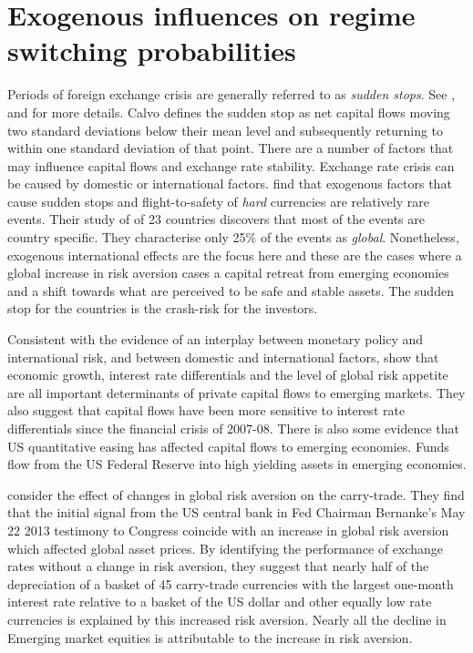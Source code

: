 \documentclass[12pt, a4paper, oneside]{article}\usepackage[]{graphicx}\usepackage[]{color}
\begin{document}
\section{Exogenous influences on regime switching probabilities}
Periods of foreign exchange crisis are generally referred to as \emph{sudden stops}.  See \citet{DornbuschSS}, \citet{CalvoSS} and \citet{KrugmanSS} for more details. Calvo  defines the sudden stop as net capital flows moving two standard deviations below their mean level and subsequently returning to within one standard deviation of that point. There are a number of factors that may influence capital flows and exchange rate stability. Exchange rate crisis can be caused by domestic or international factors.  \citet{FTS} find  that exogenous factors that cause sudden stops and flight-to-safety of \emph{hard} currencies  are relatively rare events. Their study of of 23 countries discovers that most of the events are country specific. They characterise only 25\% of the events as \emph{global}. Nonetheless, exogenous international effects are the focus here and these are the cases where a global increase in risk aversion cases a capital retreat from emerging economies and a shift towards what are perceived to be safe and stable assets. The sudden stop for the countries is the crash-risk for the investors. 

  Consistent with the evidence of an interplay between monetary policy and international risk, and between domestic and international factors, \citet{Ahmed2014} show that economic growth, interest rate differentials and the level of global risk appetite are all important determinants of private capital flows to emerging markets.  They also suggest that capital flows have been more sensitive to interest rate differentials since the financial crisis of 2007-08. There is also some evidence that US quantitative easing has affected capital flows to emerging economies.  Funds flow from the US Federal Reserve into high yielding assets in emerging economies. 

\citet{NYFedtaper} consider the effect of changes in global risk aversion on the carry-trade.  They find that the initial signal from the US central bank in Fed Chairman Bernanke's May 22 2013 testimony to Congress coincide with an increase in global risk aversion which affected global asset prices.  By identifying the performance of exchange rates without a change in risk aversion, they suggest that nearly half of the depreciation of a basket of 45 carry-trade currencies with the largest one-month interest rate relative to a basket of the US dollar and other equally low rate currencies is explained by this increased risk aversion. Nearly all the decline in Emerging market equities is attributable to the increase in risk aversion.
\end{document}
